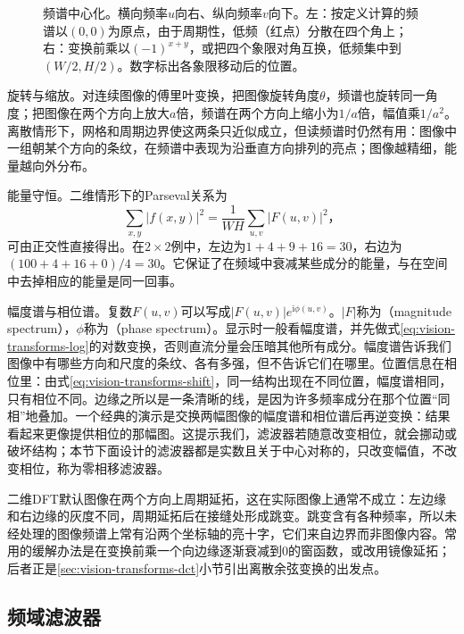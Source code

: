 \begin{figure}[htbp]
  \centering
  
  \caption{频谱中心化。横向频率$u$向右、纵向频率$v$向下。左：按定义计算的频谱以$(0,0)$为原点，由于周期性，低频（红点）分散在四个角上；右：变换前乘以$(-1)^{x+y}$，或把四个象限对角互换，低频集中到$(W/2,H/2)$。数字标出各象限移动后的位置。}
  \label{fig:vision-transforms-spectrum-centering}
\end{figure}

旋转与缩放。对连续图像的傅里叶变换，把图像旋转角度$\theta$，频谱也旋转同一角度；把图像在两个方向上放大$a$倍，频谱在两个方向上缩小为$1/a$倍，幅值乘$1/a^2$。离散情形下，网格和周期边界使这两条只近似成立，但读频谱时仍然有用：图像中一组朝某个方向的条纹，在频谱中表现为沿垂直方向排列的亮点；图像越精细，能量越向外分布。

能量守恒。二维情形下的Parseval关系为
\[
  \sum_{x,y}|f(x,y)|^2=\frac{1}{WH}\sum_{u,v}|F(u,v)|^2\text{，}
\]
可由正交性直接得出。在$2\times2$例中，左边为$1+4+9+16=30$，右边为$(100+4+16+0)/4=30$。它保证了在频域中衰减某些成分的能量，与在空间中去掉相应的能量是同一回事。

幅度谱与相位谱。复数$F(u,v)$可以写成$|F(u,v)|e^{\mathrm{i}\phi(u,v)}$。$|F|$称为（magnitude spectrum），$\phi$称为（phase spectrum）。显示时一般看幅度谱，并先做式\eqref{eq:vision-transforms-log}的对数变换，否则直流分量会压暗其他所有成分。幅度谱告诉我们图像中有哪些方向和尺度的条纹、各有多强，但不告诉它们在哪里。位置信息在相位里：由式\eqref{eq:vision-transforms-shift}，同一结构出现在不同位置，幅度谱相同，只有相位不同。边缘之所以是一条清晰的线，是因为许多频率成分在那个位置“同相”地叠加。一个经典的演示是交换两幅图像的幅度谱和相位谱后再逆变换：结果看起来更像提供相位的那幅图。这提示我们，滤波器若随意改变相位，就会挪动或破坏结构；本节下面设计的滤波器都是实数且关于中心对称的，只改变幅值，不改变相位，称为零相移滤波器。

二维DFT默认图像在两个方向上周期延拓，这在实际图像上通常不成立：左边缘和右边缘的灰度不同，周期延拓后在接缝处形成跳变。跳变含有各种频率，所以未经处理的图像频谱上常有沿两个坐标轴的亮十字，它们来自边界而非图像内容。常用的缓解办法是在变换前乘一个向边缘逐渐衰减到0的窗函数，或改用镜像延拓；后者正是\ref{sec:vision-transforms-dct}小节引出离散余弦变换的出发点。

\subsection{频域滤波器}
\label{sec:vision-transforms-frequency-filters}

